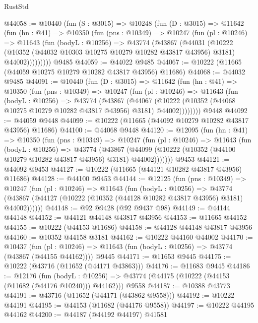 \begin{lexlean}{RustStd}
\begin{coremodule}
@44058 := @10440
    (fun (S : @3015) =>
    @10248
      (fun (D : @3015) =>
      @11642
        (fun (hn : @41) =>
        @10350
          (fun (pns : @10349) =>
          @10247
            (fun (pl : @10246) =>
            @11643
              (fun (bodyL : @10256) =>
              @43774
                (@43867
                  (@44031
                    (@10222
                      (@10352 (@44032 @10303 @10275 @10279 @10282 @43817 @43956) @3181)
                      @44002)))))))))
    @9485
@44059 := @44022 @9485
@44067 := @10222 (@11665 (@44059 @10275 @10279 @10282 @43817 @43956) @11686)
@44068 := @44032 @9485
@44091 := @10440
    (fun (D : @3015) =>
    @11642
      (fun (hn : @41) =>
      @10350
        (fun (pns : @10349) =>
        @10247
          (fun (pl : @10246) =>
          @11643
            (fun (bodyL : @10256) =>
            @43774
              (@43867
                (@44067
                  (@10222 (@10352 (@44068 @10275 @10279 @10282 @43817 @43956) @3181) @44002))))))))
    @9448
@44092 := @44059 @9448
@44099 := @10222 (@11665 (@44092 @10279 @10282 @43817 @43956) @11686)
@44100 := @44068 @9448
@44120 := @12095
    (fun (hn : @41) =>
    @10350
      (fun (pns : @10349) =>
      @10247
        (fun (pl : @10246) =>
        @11643
          (fun (bodyL : @10256) =>
          @43774
            (@43867
              (@44099 (@10222 (@10352 (@44100 @10279 @10282 @43817 @43956) @3181) @44002)))))))
    @9453
@44121 := @44092 @9453
@44127 := @10222 (@11665 (@44121 @10282 @43817 @43956) @11686)
@44128 := @44100 @9453
@44144 := @12125
    (fun (pns : @10349) =>
    @10247
      (fun (pl : @10246) =>
      @11643
        (fun (bodyL : @10256) =>
        @43774 (@43867 (@44127 (@10222 (@10352 (@44128 @10282 @43817 @43956) @3181) @44002))))))
@44148 := @92 @9428 (@92 @9437 @98)
@44149 := @44144 @44148
@44152 := @44121 @44148 @43817 @43956
@44153 := @11665 @44152
@44155 := @10222 (@44153 @11686)
@44158 := @44128 @44148 @43817 @43956
@44160 := @10352 @44158 @3181
@44162 := @10222 @44160 @44002
@44170 := @10437
    (fun (pl : @10246) => @11643 (fun (bodyL : @10256) => @43774 (@43867 (@44155 @44162))))
    @9445
@44171 := @11653 @9445
@44175 := @10222 (@43716 (@11652 (@44171 @43863)))
@44176 := @11683 @9445
@44186 := @12176
    (fun (bodyL : @10256) => @43774 (@44175 (@10222 (@44153 (@11682 (@44176 @10240))) @44162)))
    @9558
@44187 := @10388 @43773
@44191 := @43716 (@11652 (@44171 (@43862 @9558)))
@44192 := @10222 @44191
@44195 := @44153 (@11682 (@44176 @9558))
@44197 := @10222 @44195 @44162
@44200 := @44187 (@44192 @44197) @41581

\end{coremodule}
\end{lexlean}
